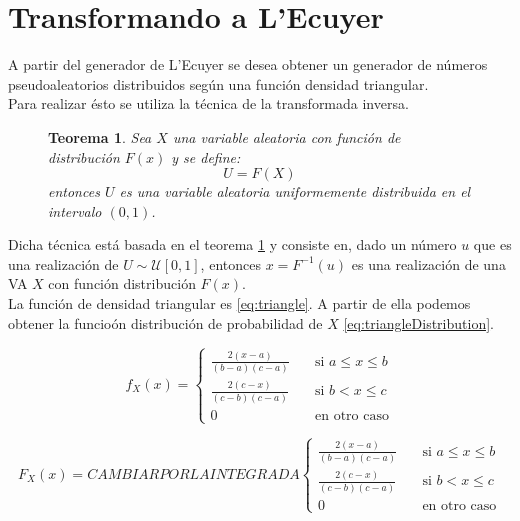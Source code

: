 \documentclass{sig-alternate}
\newtheorem{theorem}{Teorema}
\begin{document}
\section{Transformando a L'Ecuyer}
\label{sec:triangle}

A partir del generador de L'Ecuyer se desea obtener un generador de n\'umeros
pseudoaleatorios distribuidos seg\'un una funci\'on densidad triangular.\\
Para realizar \'esto se utiliza la t\'ecnica de la transformada inversa.

\begin{figure}
\begin{theorem}
\label{theo:1}
Sea $X$ una variable aleatoria con funci\'on de distribuci\'on $F(x)$
y se define:
$$U=F(X)$$
entonces $U$ es una variable aleatoria uniformemente distribuida en el intervalo $(0,1)$.
\end{theorem}
\end{figure}

Dicha t\'ecnica est\'a basada en el teorema \ref{theo:1} y consiste
en, dado un n\'umero $u$ que es una realizaci\'on de $U\sim\mathcal{U}[0,1]$,
entonces $x = F^{-1}(u)$ es una realizaci\'on de una VA $X$ con funci\'on
distribuci\'on $F(x)$.\\

La funci\'on de densidad triangular es \eqref{eq:triangle}. A partir de ella
podemos obtener la funcio\'on distribuci\'on de probabilidad de $X$
\eqref{eq:triangleDistribution}.

\begin{equation}
\label{eq:triangle}
f_{X}(x) =
\begin{cases}
\frac{2(x-a)}{(b-a)(c-a)} \quad & \text{si } a\leq x \leq b \\
\frac{2(c-x)}{(c-b)(c-a)} \quad & \text{si } b < x \leq c \\
0 \quad & \text{en otro caso}
\end{cases}
\end{equation}

\begin{equation}
\label{eq:triangleDistribution}
F_{X}(x) =
CAMBIAR POR LA INTEGRADA
\begin{cases}
\frac{2(x-a)}{(b-a)(c-a)} \quad & \text{si } a\leq x \leq b \\
\frac{2(c-x)}{(c-b)(c-a)} \quad & \text{si } b < x \leq c \\
0 \quad & \text{en otro caso}
\end{cases}
\end{equation}
\end{document}
